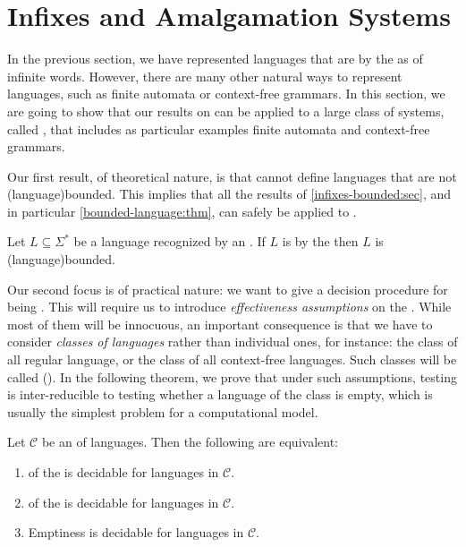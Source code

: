 \section{Infixes and Amalgamation Systems}
\label{infixes-amalgamation:sec}

\AP In the previous section, we have represented languages that are
 by the  as  of infinite
words. However, there are many other natural ways to represent languages, such
as finite automata or context-free grammars. In this section, we are going to
show that our results on  can be applied to a large class
of systems, called , that includes as particular
examples finite automata and context-free grammars. 

\AP Our first result, of theoretical nature, is that 
cannot define  languages that are not
\kl(language){bounded}. This implies that all the results of
\cref{infixes-bounded:sec}, and in particular \cref{bounded-language:thm}, can
safely be applied to .

\begin{theorem}
    \label{infix-amalgamation:thm}
    Let $L \subseteq \Sigma^*$ be a language recognized by an 
    .
    If $L$ is  by the  then $L$ is
    \kl(language){bounded}.
\end{theorem}

\AP Our second focus is of practical nature: we want to give a decision
procedure for being . This will require us to introduce
\emph{effectiveness assumptions} on the . While most
of them will be innocuous, an important consequence is that we have to consider
\emph{classes of languages} rather than individual ones, for instance: the
class of all regular language, or the class of all context-free languages. Such
classes will be called  (). In the following theorem, we prove that under such
assumptions, testing  is inter-reducible to testing
whether a language of the class is empty, which is usually the simplest
problem for a computational model.

\begin{theorem}
	\label{infix-wqo-is-emptiness:thm}
	Let $\mathcal{C}$ be an  of languages.
    Then the following are equivalent:
	\begin{enumerate}
        \item\label{wqo-infix-decidable}  of the  is decidable for languages in $\mathcal{C}$.
        \item\label{wqo-prefix-decidable}  of the  is decidable for languages in $\mathcal{C}$.
        \item\label{emptiness-decidable} Emptiness is decidable for languages in $\mathcal{C}$.
	\end{enumerate}
\end{theorem}

